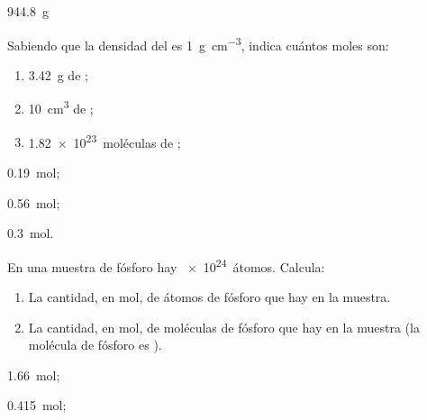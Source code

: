 \documentclass[10pt,a5paper,twoside]{article}
\begin{document}
  \begin{solution}
    \SI{944.8}{\gram}
  \end{solution}




  \begin{exercise}[
      tags    = {termodinámica, entalpía, entalpia de reacción, calor},
      topics  = {química, termoquímica, termodinámica},
      source  = {FQ 1B OXF 2015, p43, e34},
    ]
    Sabiendo que la densidad del  es \SI{1}{\gram\per\cubic\centi\meter}, indica cuántos moles son:
    \begin{enumerate}
      \item \SI{3.42}{\gram} de ;
      \item \SI{10}{\cubic\centi\meter} de ;
      \item \SI{1.82e23}{moléculas} de ;
    \end{enumerate}
  \end{exercise}

  \begin{solution}
    \begin{enumerate*}
      \item \SI{0.19}{\mole};
      \item \SI{0.56}{\mole};
      \item \SI{0.3}{\mole}.
    \end{enumerate*}
  \end{solution}




  \begin{exercise}[
      tags    = {termodinámica, entalpía, entalpia de reacción, calor},
      topics  = {química, termoquímica, termodinámica},
      source  = {FQ 1B OXF 2015, p43, e37},
    ]
    En una muestra de fósforo hay \SI{e24}{átomos}. Calcula:
    \begin{enumerate}
      \item La cantidad, en mol, de átomos de fósforo que hay en la muestra.
      \item La cantidad, en mol, de moléculas de fósforo que hay en la muestra (la molécula de fósforo es ).
    \end{enumerate}
  \end{exercise}

  \begin{solution}
    \begin{enumerate*}
      \item \SI{1.66}{\mole};
      \item \SI{0.415}{\mole};
    \end{enumerate*}
  \end{solution}
\end{document}
